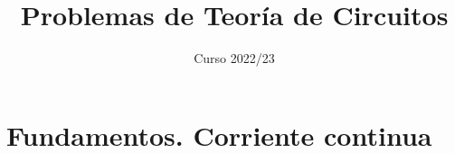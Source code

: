\documentclass[oldfontcommands,a4paper]{memoir}
\begin{document}
\begin{titlingpage}

\title{Problemas de Teoría de Circuitos}

\author{}

\date{Curso 2022/23}

\maketitle


\end{titlingpage}

\frontmatter


\mainmatter

\chapter{Fundamentos. Corriente continua}




\backmatter
\end{document}
